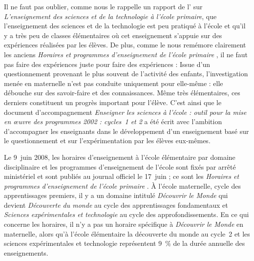 Il ne faut pas oublier, comme nous le rappelle un rapport de l’ sur \textit{L’enseignement des sciences et de la technologie à l’école primaire}, que l’enseignement des sciences et de la technologie est peu pratiqué à l’école et qu’il y a très peu de classes élémentaires où cet enseignement s’appuie sur des expériences réalisées par les élèves. De plus, comme le nous remémore clairement les anciens \textit{Horaires et programmes d’enseignement de l’école primaire} \cite[p.~31]{BO2002}, il ne faut pas faire des expériences juste pour faire des expériences : 
Issue d’un questionnement provenant le plus souvent de l’activité des enfants, l’investigation menée en maternelle n’est pas conduite uniquement pour elle-même : elle débouche sur des savoir-faire et des connaissances. Même très élémentaires, ces derniers constituent un progrès important pour l’élève.
C’est ainsi que le document d’accompagnement \textit{Enseigner les sciences à l’école : outil pour la mise en œuvre des programmes 2002 : cycles~1 et 2} \cite{CNDP2002} a été écrit avec l’ambition d’accompagner les enseignants dans le développement d’un enseignement basé sur le questionnement et sur l’expérimentation par les élèves eux-mêmes.

Le 9~juin 2008, les horaires d’enseignement à l’école élémentaire par domaine disciplinaire et les programmes d’enseignement de l’école sont fixés par arrêté ministériel et sont publiés au journal officiel le 17~juin ; ce sont les \textit{Horaires et programmes d’enseignement de l’école primaire} \cite{BO2008}. À l’école maternelle, cycle des apprentissages premiers, il y a un domaine intitulé \emph{Découvrir le Monde} qui devient \emph{Découverte du monde} au cycle des apprentissages fondamentaux et \emph{Sciences expérimentales et technologie} au cycle des approfondissements. En ce qui concerne les horaires, il n’y a pas un horaire spécifique à \emph{Découvrir le Monde} en maternelle, alors qu’à l’école élémentaire la \og découverte du monde \fg{} au cycle~2 et les \og sciences expérimentales et technologie \fg{} représentent 9~\% de la durée annuelle des enseignements. %

